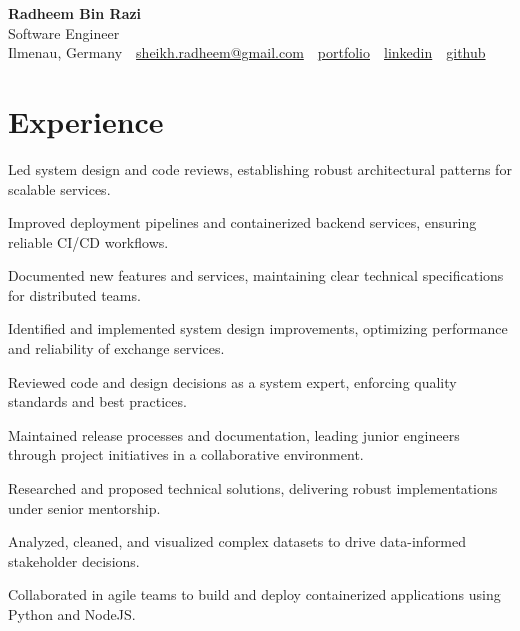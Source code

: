 \documentclass[11pt,a4paper]{resume}
\makeatletter
\newcommand{\Portfolio}{https://radheem.github.io/my-cv}
\newcommand{\PortfolioText}{portfolio}
\newcommand{\GitHub}{https://github.com/radheem}
\newcommand{\LinkedIn}{https://www.linkedin.com/in/radheem-razi}
\newcommand{\Email}{sheikh.radheem@gmail.com}
\makeatother
\begin{document}
\begin{center}
  {\huge\bfseries Radheem Bin Razi}\\[3pt]
  {\large Software Engineer}\\[6pt]
  \small
  Ilmenau, Germany \,\textbar\,
  \href{mailto:\Email}{\Email} \,\textbar\,
  \href{\Portfolio}{\PortfolioText} \,\textbar\,
  \href{\LinkedIn}{linkedin} \,\textbar\,
  \href{\GitHub}{github}
\end{center}
\vspace{2pt}

\section{Experience}

\bullets
  \item Led system design and code reviews, establishing robust architectural patterns for scalable services.
  \item Improved deployment pipelines and containerized backend services, ensuring reliable CI/CD workflows.
  \item Documented new features and services, maintaining clear technical specifications for distributed teams.
\bulletsend
\vspace{3pt}
\bullets
  \item Identified and implemented system design improvements, optimizing performance and reliability of exchange services.
  \item Reviewed code and design decisions as a system expert, enforcing quality standards and best practices.
  \item Maintained release processes and documentation, leading junior engineers through project initiatives in a collaborative environment.
\bulletsend
\vspace{3pt}
\bullets
  \item Researched and proposed technical solutions, delivering robust implementations under senior mentorship.
  \item Analyzed, cleaned, and visualized complex datasets to drive data-informed stakeholder decisions.
  \item Collaborated in agile teams to build and deploy containerized applications using Python and NodeJS.
\bulletsend
\vspace{3pt}
\end{document}
